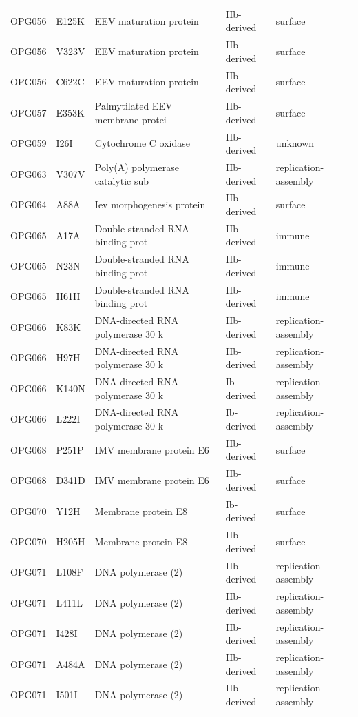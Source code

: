 \documentclass[11pt]{article}
\begin{document}
\begin{longtable}{lllll}
OPG056 & E125K & EEV maturation protein & IIb-derived & surface \\
OPG056 & V323V & EEV maturation protein & IIb-derived & surface \\
OPG056 & C622C & EEV maturation protein & IIb-derived & surface \\
OPG057 & E353K & Palmytilated EEV membrane protei & IIb-derived & surface \\
OPG059 & I26I & Cytochrome C oxidase & IIb-derived & unknown \\
OPG063 & V307V & Poly(A) polymerase catalytic sub & IIb-derived & replication-assembly \\
OPG064 & A88A & Iev morphogenesis protein & IIb-derived & surface \\
OPG065 & A17A & Double-stranded RNA binding prot & IIb-derived & immune \\
OPG065 & N23N & Double-stranded RNA binding prot & IIb-derived & immune \\
OPG065 & H61H & Double-stranded RNA binding prot & IIb-derived & immune \\
OPG066 & K83K & DNA-directed RNA polymerase 30 k & IIb-derived & replication-assembly \\
OPG066 & H97H & DNA-directed RNA polymerase 30 k & IIb-derived & replication-assembly \\
OPG066 & K140N & DNA-directed RNA polymerase 30 k & Ib-derived & replication-assembly \\
OPG066 & L222I & DNA-directed RNA polymerase 30 k & Ib-derived & replication-assembly \\
OPG068 & P251P & IMV membrane protein E6 & IIb-derived & surface \\
OPG068 & D341D & IMV membrane protein E6 & IIb-derived & surface \\
OPG070 & Y12H & Membrane protein E8 & Ib-derived & surface \\
OPG070 & H205H & Membrane protein E8 & IIb-derived & surface \\
OPG071 & L108F & DNA polymerase (2) & IIb-derived & replication-assembly \\
OPG071 & L411L & DNA polymerase (2) & IIb-derived & replication-assembly \\
OPG071 & I428I & DNA polymerase (2) & IIb-derived & replication-assembly \\
OPG071 & A484A & DNA polymerase (2) & IIb-derived & replication-assembly \\
OPG071 & I501I & DNA polymerase (2) & IIb-derived & replication-assembly \\

\end{longtable}
\end{document}
